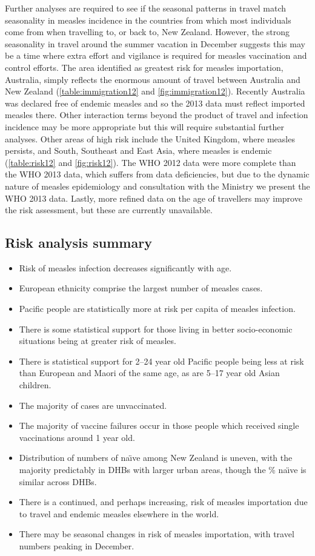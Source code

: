 \documentclass{article}
\begin{document}
Further analyses are required to see if the seasonal patterns in travel match seasonality in measles incidence in the countries from which most individuals come from when travelling to, or back to, New Zealand. However, the strong seasonality in travel around the summer vacation in December suggests this may be a time where extra effort and vigilance is required for measles vaccination and control efforts. The area identified as greatest risk for measles importation, Australia, simply reflects the enormous amount of travel between Australia and New Zealand (\autoref{table:immigration12} and \autoref{fig:immigration12}). Recently Australia was declared free of endemic measles and so the 2013 data must reflect imported measles there. Other interaction terms beyond the product of travel and infection incidence may be more appropriate but this will require substantial further analyses. Other areas of high risk include the United Kingdom, where measles persists, and South, Southeast and East Asia, where measles is endemic (\autoref{table:risk12} and \autoref{fig:risk12}). The WHO 2012 data were more complete than the WHO 2013 data, which suffers from data deficiencies, but due to the dynamic nature of measles epidemiology and consultation with the Ministry we present the WHO 2013 data. Lastly, more refined data on the age of travellers may improve the risk assessment, but these are currently unavailable.

\subsection{Risk analysis summary}
\begin{itemize}
\item Risk of measles infection decreases significantly with age.
\item European ethnicity comprise the largest number of measles cases.
\item Pacific people are statistically more at risk per capita of measles infection.
\item There is some statistical support for those living in better socio-economic situations being at greater risk of measles.
\item There is statistical support for 2--24 year old Pacific people being less at risk than European and Maori of the same age, as are 5--17 year old Asian children.
\item The majority of cases are unvaccinated.
\item The majority of vaccine failures occur in those people which received single vaccinations around 1 year old.
\item Distribution of numbers of na\"{\i}ve among New Zealand is uneven, with the majority predictably in DHBs with larger urban areas, though the \%  na\"{\i}ve is similar across DHBs.
\item There is a continued, and perhaps increasing, risk of measles importation due to travel and endemic measles elsewhere in the world.
\item There may be seasonal changes in risk of measles importation, with travel numbers peaking in December.
\end{itemize}
\end{document}
